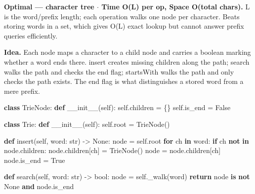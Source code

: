 \documentclass[11pt]{article}
\newenvironment{Shaded}{\begin{snugshade}}{\end{snugshade}}
\newcommand{\BuiltInTok}[1]{\textcolor[rgb]{0.50,0.55,0.55}{#1}}
\newcommand{\ControlFlowTok}[1]{\textcolor[rgb]{0.99,0.74,0.29}{\textbf{#1}}}
\newcommand{\FunctionTok}[1]{\textcolor[rgb]{0.56,0.27,0.68}{#1}}
\newcommand{\KeywordTok}[1]{\textcolor[rgb]{0.81,0.81,0.76}{\textbf{#1}}}
\newcommand{\NormalTok}[1]{\textcolor[rgb]{0.81,0.81,0.76}{#1}}
\newcommand{\OperatorTok}[1]{\textcolor[rgb]{0.81,0.81,0.76}{#1}}
\newcommand{\VariableTok}[1]{\textcolor[rgb]{0.15,0.68,0.68}{#1}}
\begin{document}
\textbf{Optimal --- character tree \(\cdot\) Time O(L) per op, Space O(total chars).} L is the word/prefix length; each operation walks one node per character. Beats storing words in a set, which gives O(L) exact lookup but cannot answer prefix queries efficiently.

\textbf{Idea.} Each node maps a character to a child node and carries a boolean marking whether a word ends there. insert creates missing children along the path; search walks the path and checks the end flag; startsWith walks the path and only checks the path exists. The end flag is what distinguishes a stored word from a mere prefix.


\begin{Shaded}
\begin{Highlighting}[]
\KeywordTok{class}\NormalTok{ TrieNode:}
    \KeywordTok{def} \FunctionTok{\_\_init\_\_}\NormalTok{(}\VariableTok{self}\NormalTok{):}
        \VariableTok{self}\NormalTok{.children }\OperatorTok{=}\NormalTok{ \{\}}
        \VariableTok{self}\NormalTok{.is\_end }\OperatorTok{=} \VariableTok{False}

\KeywordTok{class}\NormalTok{ Trie:}
    \KeywordTok{def} \FunctionTok{\_\_init\_\_}\NormalTok{(}\VariableTok{self}\NormalTok{):}
        \VariableTok{self}\NormalTok{.root }\OperatorTok{=}\NormalTok{ TrieNode()}

    \KeywordTok{def}\NormalTok{ insert(}\VariableTok{self}\NormalTok{, word: }\BuiltInTok{str}\NormalTok{) }\OperatorTok{{-}\textgreater{}} \VariableTok{None}\NormalTok{:}
\NormalTok{        node }\OperatorTok{=} \VariableTok{self}\NormalTok{.root}
        \ControlFlowTok{for}\NormalTok{ ch }\KeywordTok{in}\NormalTok{ word:}
            \ControlFlowTok{if}\NormalTok{ ch }\KeywordTok{not} \KeywordTok{in}\NormalTok{ node.children:}
\NormalTok{                node.children[ch] }\OperatorTok{=}\NormalTok{ TrieNode()}
\NormalTok{            node }\OperatorTok{=}\NormalTok{ node.children[ch]}
\NormalTok{        node.is\_end }\OperatorTok{=} \VariableTok{True}

    \KeywordTok{def}\NormalTok{ search(}\VariableTok{self}\NormalTok{, word: }\BuiltInTok{str}\NormalTok{) }\OperatorTok{{-}\textgreater{}} \BuiltInTok{bool}\NormalTok{:}
\NormalTok{        node }\OperatorTok{=} \VariableTok{self}\NormalTok{.\_walk(word)}
        \ControlFlowTok{return}\NormalTok{ node }\KeywordTok{is} \KeywordTok{not} \VariableTok{None} \KeywordTok{and}\NormalTok{ node.is\_end}


\end{Highlighting}
\end{Shaded}
\end{document}
